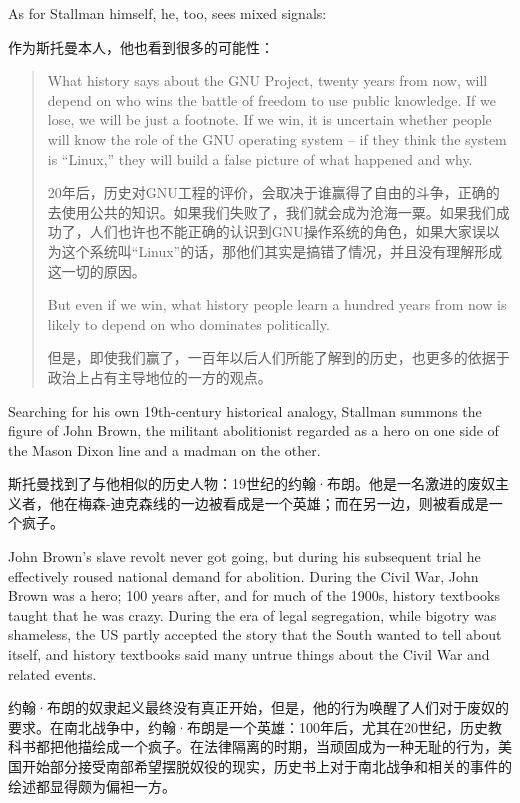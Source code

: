 \ifdefined\eng
As for Stallman himself, he, too, sees mixed signals:
\fi

\ifdefined\chs
作为斯托曼本人，他也看到很多的可能性：
\fi

\begin{quote}
\ifdefined\eng
What history says about the GNU Project, twenty years from now, will depend on who wins the battle of freedom to use public knowledge. If we lose, we will be just a footnote. If we win, it is uncertain whether people will know the role of the GNU operating system -- if they think the system is ``Linux,'' they will build a false picture of what happened and why.
\fi

\ifdefined\chs
20年后，历史对GNU工程的评价，会取决于谁赢得了自由的斗争，正确的去使用公共的知识。如果我们失败了，我们就会成为沧海一粟。如果我们成功了，人们也许也不能正确的认识到GNU操作系统的角色，如果大家误以为这个系统叫``Linux''的话，那他们其实是搞错了情况，并且没有理解形成这一切的原因。
\fi

\ifdefined\eng
But even if we win, what history people learn a hundred years from now is likely to depend on who dominates politically.
\fi

\ifdefined\chs
但是，即使我们赢了，一百年以后人们所能了解到的历史，也更多的依据于政治上占有主导地位的一方的观点。
\fi
\end{quote}

\ifdefined\eng
Searching for his own 19th-century historical analogy, Stallman summons the figure of John Brown, the militant abolitionist regarded as a hero on one side of the Mason Dixon line and a madman on the other.
\fi

\ifdefined\chs
斯托曼找到了与他相似的历史人物：19世纪的约翰·布朗。他是一名激进的废奴主义者，他在梅森-迪克森线的一边被看成是一个英雄；而在另一边，则被看成是一个疯子。
\fi

\ifdefined\eng
John Brown's slave revolt never got going, but during his subsequent trial he effectively roused national demand for abolition. During the Civil War, John Brown was a hero; 100 years after, and for much of the 1900s, history textbooks taught that he was crazy. During the era of legal segregation, while bigotry was shameless, the US partly accepted the story that the South wanted to tell about itself, and history textbooks said many untrue things about the Civil War and related events.
\fi

\ifdefined\chs
约翰·布朗的奴隶起义最终没有真正开始，但是，他的行为唤醒了人们对于废奴的要求。在南北战争中，约翰·布朗是一个英雄：100年后，尤其在20世纪，历史教科书都把他描绘成一个疯子。在法律隔离的时期，当顽固成为一种无耻的行为，美国开始部分接受南部希望摆脱奴役的现实，历史书上对于南北战争和相关的事件的绘述都显得颇为偏袒一方。
\fi

